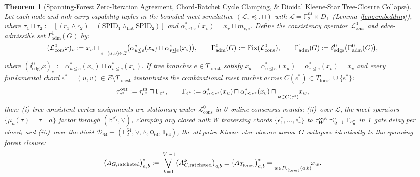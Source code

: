 \documentclass[10pt,twocolumn]{article}
\let\bigsqcap\relax
\newcommand{\bigsqcap}{\mathop{\vphantom{\bigcap}\mathchoice
  {\vcenter{\hbox{\huge$\sqcap$}}}
  {\vcenter{\hbox{\Large$\sqcap$}}}
  {\vcenter{\hbox{\normalsize$\sqcap$}}}
  {\vcenter{\hbox{\small$\sqcap$}}}}\displaylimits}
\theoremstyle{spectralthm}
\newtheorem{theorem}{Theorem}[section]
\begin{document}
\begin{theorem}[Spanning-Forest Zero-Iteration Agreement, Chord-Ratchet Cycle Clamping, \& Dioidal Kleene-Star Tree-Closure Collapse]
\label{thm:agreement}
Let each node and link carry capability tuples in the bounded meet-semilattice $(\mathcal{L}, \preceq, \sqcap)$ with $\mathcal{L} = \mathbb{F}_2^{64} \times D_\perp$ (Lemma~\ref{lem:embedding}), where $\tau_1 \sqcap \tau_2 := [(r_1 \wedge r_2) \parallel (\mathrm{SPID}_1 \wedge_{\mathrm{flat}} \mathrm{SPID}_2)]$ and $\alpha_{v \trianglelefteq e}^*(x_v) = x_v \sqcap m_{v,e}$. Define the consistency operator $\mathcal{L}_{\mathrm{cons}}^0$ and edge-admissible set $\Gamma_{\mathrm{adm}}^1(G)$ by:
\begin{equation}
\label{eq:cons}
(\mathcal{L}_{\mathrm{cons}}^0 x)_v := x_v \sqcap \underset{e=(u,v) \in E}{\bigsqcap} \bigl(\alpha_{u \trianglelefteq e}^*(x_u) \sqcap \alpha_{v \trianglelefteq e}^*(x_v)\bigr),\qquad
\Gamma_{\mathrm{adm}}^0(G) := \mathrm{Fix}(\mathcal{L}_{\mathrm{cons}}^0), \qquad \Gamma_{\mathrm{adm}}^1(G) := \delta_{\mathrm{edge}}^0\bigl(\Gamma_{\mathrm{adm}}^0(G)\bigr),
\end{equation}
where $(\delta_{\mathrm{edge}}^0 x)_e := \alpha_{u \trianglelefteq e}^*(x_u) \sqcap \alpha_{v \trianglelefteq e}^*(x_v)$. If tree branches $e \in T_{\mathrm{forest}}$ satisfy $x_u = \alpha_{u \trianglelefteq e}^*(x_u) = \alpha_{v \trianglelefteq e}^*(x_v) = x_v$ and every fundamental chord $e^* = (u,v) \in E \setminus T_{\mathrm{forest}}$ instantiates the combinational meet ratchet across $C(e^*) \subset T_{\mathrm{forest}} \cup \{e^*\}$:
\begin{equation}
\label{eq:chord_ratchet}
\tau_{e^*}^{\mathrm{out}} := \tau_{e^*}^{\mathrm{in}} \sqcap \Gamma_{e^*},\qquad
\Gamma_{e^*} := \alpha_{u \trianglelefteq e^*}^*(x_u) \sqcap \alpha_{v \trianglelefteq e^*}^*(x_v) \sqcap \underset{w \in C(e^*)}{\bigsqcap} x_w,
\end{equation}
then: (i)~tree-consistent vertex assignments are stationary under $\mathcal{L}_{\mathrm{cons}}^0$ in 0~online consensus rounds; (ii)~over $\mathcal{L}$, the meet operators $\{\mu_a(\tau) = \tau \sqcap a\}$ factor through $(\mathbb{B}^{\beta_1}, \vee)$, clamping any closed walk $W$ traversing chords $\{e_1^*,\ldots,e_r^*\}$ to $\tau_W^{\mathrm{out}} \preceq \bigsqcap_{q=1}^r \Gamma_{e_q^*}$ in 1~gate delay per chord; and (iii)~over the dioid $\mathcal{D}_{64} = (\mathbb{F}_2^{64}, \vee, \wedge, \mathbf{0}_{64}, \mathbf{1}_{64})$, the all-pairs Kleene-star closure across $G$ collapses identically to the spanning-forest closure:
\begin{equation}
\label{eq:kleene_collapse}
\bigl(A_{G,\mathrm{ratcheted}}\bigr)_{a,b}^* := \bigvee_{k=0}^{|V|-1} \bigl(A_{G,\mathrm{ratcheted}}^k\bigr)_{a,b}
\equiv \bigl(A_{T_{\mathrm{forest}}}\bigr)_{a,b}^* = \underset{w \in P_{T_{\mathrm{forest}}}(a,b)}{\bigsqcap} x_w.
\end{equation}
\end{theorem}
\end{document}
